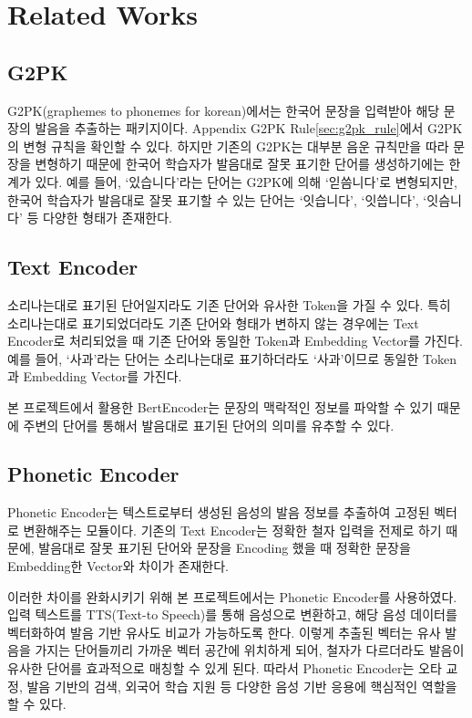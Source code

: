 \documentclass[letterpaper]{article} %
\begin{document}
\section{Related Works}
\subsection{G2PK}
G2PK(graphemes to phonemes for korean)에서는 한국어 문장을 입력받아 해당 문장의 발음을 추출하는 패키지이다.
Appendix G2PK Rule\ref{sec:g2pk_rule}에서 G2PK의 변형 규칙을 확인할 수 있다.
하지만 기존의 G2PK는 대부분 음운 규칙만을 따라 문장을 변형하기 때문에 한국어 학습자가 발음대로 잘못 표기한 단어를 생성하기에는 한계가 있다.
예를 들어, `있습니다'라는 단어는 G2PK에 의해 `읻씀니다'로 변형되지만, 한국어 학습자가 발음대로 잘못 표기할 수 있는 단어는 `잇습니다', `잇씁니다', `잇슴니다' 등 다양한 형태가 존재한다.

\subsection{Text Encoder}
소리나는대로 표기된 단어일지라도 기존 단어와 유사한 Token을 가질 수 있다. 
특히 소리나는대로 표기되었더라도 기존 단어와 형태가 변하지 않는 경우에는 Text Encoder로 처리되었을 때 기존 단어와 동일한 Token과 Embedding Vector를 가진다. 
예를 들어, `사과'라는 단어는 소리나는대로 표기하더라도 `사과'이므로 동일한 Token과 Embedding Vector를 가진다.

본 프로젝트에서 활용한 BertEncoder는 문장의 맥락적인 정보를 파악할 수 있기 때문에 주변의 단어를 통해서 발음대로 표기된 단어의 의미를 유추할 수 있다.

\subsection{Phonetic Encoder}
Phonetic Encoder는 텍스트로부터 생성된 음성의 발음 정보를 추출하여 고정된 벡터로 변환해주는 모듈이다.
기존의 Text Encoder는 정확한 철자 입력을 전제로 하기 때문에, 발음대로 잘못 표기된 단어와 문장을 Encoding 했을 때 정확한 문장을 Embedding한 Vector와 차이가 존재한다.

이러한 차이를 완화시키기 위해 본 프로젝트에서는 Phonetic Encoder를 사용하였다. 입력 텍스트를 TTS(Text-to Speech)를 통해 음성으로 변환하고, 해당 음성 데이터를 벡터화하여 발음 기반 유사도 비교가 가능하도록 한다. 이렇게 추출된 벡터는 유사 발음을 가지는 단어들끼리 가까운 벡터 공간에 위치하게 되어, 철자가 다르더라도 발음이 유사한 단어를 효과적으로 매칭할 수 있게 된다. 따라서 Phonetic Encoder는 오타 교정, 발음 기반의 검색, 외국어 학습 지원 등 다양한 음성 기반 응용에 핵심적인 역할을 할 수 있다.
\end{document}
